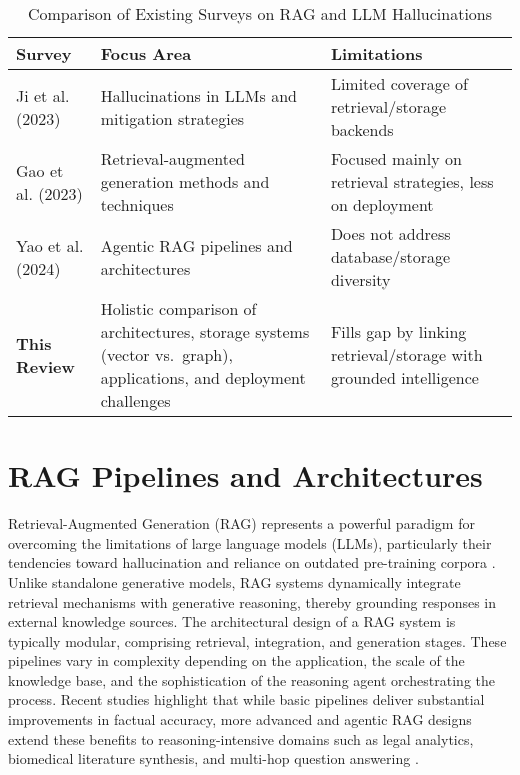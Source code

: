 \documentclass[conference]{IEEEtran}
\begin{document}
\begin{table}[ht]
\centering
\caption{Comparison of Existing Surveys on RAG and LLM Hallucinations}
\label{tab:related_surveys}
\renewcommand{\arraystretch}{1.2}
\setlength{\tabcolsep}{4pt} %
\small %
\begin{tabularx}{\linewidth}{p{2.5cm} X X}
\toprule
\textbf{Survey} & \textbf{Focus Area} & \textbf{Limitations} \\
\midrule
Ji et al. (2023) \cite{ji2023survey} 
& Hallucinations in LLMs and mitigation strategies 
& Limited coverage of retrieval/storage backends \\

Gao et al. (2023) \cite{gao2023retrievalsurvey} 
& Retrieval-augmented generation methods and techniques 
& Focused mainly on retrieval strategies, less on deployment \\

Yao et al. (2024) \cite{yao2024ragreview} 
& Agentic RAG pipelines and architectures 
& Does not address database/storage diversity \\

\midrule
\textbf{This Review} 
& Holistic comparison of architectures, storage systems (vector vs.\ graph), applications, and deployment challenges 
& Fills gap by linking retrieval/storage with grounded intelligence \\
\bottomrule
\end{tabularx}
\end{table}




\section{RAG Pipelines and Architectures}

Retrieval-Augmented Generation (RAG) represents a powerful paradigm for overcoming the limitations of large language models (LLMs), particularly their tendencies toward hallucination and reliance on outdated pre-training corpora \cite{lewis2020rag,shi2023rag,borgeaud2022retro}. Unlike standalone generative models, RAG systems dynamically integrate retrieval mechanisms with generative reasoning, thereby grounding responses in external knowledge sources. The architectural design of a RAG system is typically modular, comprising retrieval, integration, and generation stages. These pipelines vary in complexity depending on the application, the scale of the knowledge base, and the sophistication of the reasoning agent orchestrating the process. Recent studies highlight that while basic pipelines deliver substantial improvements in factual accuracy, more advanced and agentic RAG designs extend these benefits to reasoning-intensive domains such as legal analytics, biomedical literature synthesis, and multi-hop question answering \cite{gao2023retrievalsurvey,yao2024ragreview,wang2023survey}.
\end{document}
